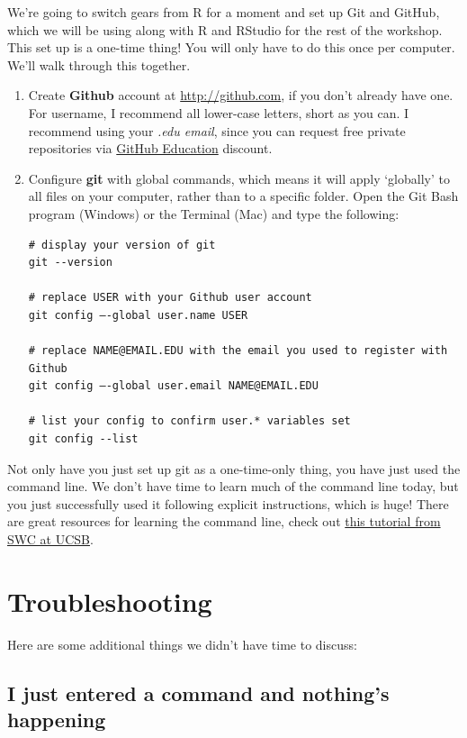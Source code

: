 \documentclass[]{book}
\theoremstyle{definition}
\theoremstyle{definition}
\theoremstyle{definition}
\theoremstyle{remark}
\begin{document}
We're going to switch gears from R for a moment and set up Git and
GitHub, which we will be using along with R and RStudio for the rest of
the workshop. This set up is a one-time thing! You will only have to do
this once per computer. We'll walk through this together.

\begin{enumerate}
\def\labelenumi{\arabic{enumi}.}
\item
  Create \textbf{Github} account at \url{http://github.com}, if you
  don't already have one. For username, I recommend all lower-case
  letters, short as you can. I recommend using your \emph{.edu email},
  since you can request free private repositories via
  \href{https://education.github.com/}{GitHub Education} discount.
\item
  Configure \textbf{git} with global commands, which means it will apply
  `globally' to all files on your computer, rather than to a specific
  folder. Open the Git Bash program (Windows) or the Terminal (Mac) and
  type the following:

\begin{verbatim}
# display your version of git
git --version

# replace USER with your Github user account
git config –-global user.name USER

# replace NAME@EMAIL.EDU with the email you used to register with Github
git config –-global user.email NAME@EMAIL.EDU

# list your config to confirm user.* variables set
git config --list
\end{verbatim}
\end{enumerate}

Not only have you just set up git as a one-time-only thing, you have
just used the command line. We don't have time to learn much of the
command line today, but you just successfully used it following explicit
instructions, which is huge! There are great resources for learning the
command line, check out
\href{http://remi-daigle.github.io/2016-04-15-UCSB/shell/}{this tutorial
from SWC at UCSB}.

\section{Troubleshooting}\label{troubleshooting}

Here are some additional things we didn't have time to discuss:

\subsection{I just entered a command and nothing's
happening}\label{i-just-entered-a-command-and-nothings-happening}
\end{document}
